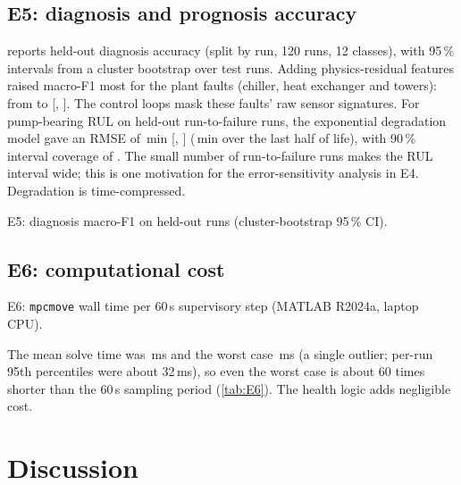 \documentclass[preprint,12pt,authoryear]{elsarticle}
\begin{document}
\subsection{E5: diagnosis and prognosis accuracy}
 reports held-out diagnosis accuracy (split by run, 120 runs, 12 classes), with 95\,\% intervals from a cluster bootstrap over test runs. Adding physics-residual features raised macro-F1 most for the plant faults (chiller, heat exchanger and towers): from \EfivePlantSensor{} to \EfivePlant{} [\EfivePlantLo, \EfivePlantHi]. The control loops mask these faults' raw sensor signatures. For pump-bearing RUL on \EfiveRulRuns{} held-out run-to-failure runs, the exponential degradation model gave an RMSE of \EfiveRulRmse\,min [\EfiveRulRmseLo, \EfiveRulRmseHi] (\EfiveRulLate\,min over the last half of life), with 90\,\% interval coverage of \EfiveRulCover. The small number of run-to-failure runs makes the RUL interval wide; this is one motivation for the error-sensitivity analysis in E4. Degradation is time-compressed.
\begin{table}[t]\centering\small
\caption{E5: diagnosis macro-F1 on held-out runs (cluster-bootstrap 95\,\% CI).}\label{tab:E5}
\begin{adjustbox}{max width=\linewidth}\end{adjustbox}
\end{table}

\subsection{E6: computational cost}
\begin{table}[t]\centering\small
\caption{E6: \texttt{mpcmove} wall time per 60\,s supervisory step (MATLAB R2024a, laptop CPU).}\label{tab:E6}
\begin{adjustbox}{max width=\linewidth}\end{adjustbox}
\end{table}
The mean solve time was \EsixMeanMs\,ms and the worst case \EsixMaxMs\,ms (a single outlier; per-run 95th percentiles were about 32\,ms), so even the worst case is about 60 times shorter than the 60\,s sampling period (\cref{tab:E6}). The health logic adds negligible cost.

\section{Discussion}\label{sec:discussion}
\end{document}
